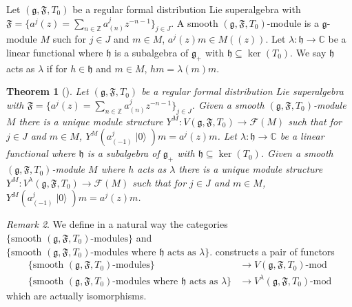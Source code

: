 \documentclass[a4paper, 12pt, reqno]{amsart}
\newtheorem{theorem}{Theorem}[section]
\theoremstyle{remark}
\newtheorem{remark}[theorem]{Remark}
\numberwithin{equation}{subsection}
\DeclareMathOperator{\vac}{|0\rangle}
\begin{document}
Let $(\mathfrak{g}, \mathfrak{F}, T_0)$ be a regular formal distribution Lie superalgebra with $\mathfrak{F} = \{a^j(z) = \sum_{n \in \mathbb{Z}}a^j_{(n)}z^{-n - 1}\}_{j \in J}$.
A smooth $(\mathfrak{g}, \mathfrak{F}, T_0)$-module is a $\mathfrak{g}$-module $M$ such for $j \in J$ and $m \in M$, $a^j(z)m \in M((z))$.
Let $\lambda: \mathfrak{h} \to \mathbb{C}$ be a linear functional where $\mathfrak{h}$ is a subalgebra of $\mathfrak{g}_+$ with $\mathfrak{h} \subseteq \ker(T_0)$.
We say $\mathfrak{h}$ acts as $\lambda$ if for $h \in \mathfrak{h}$ and $m \in M$, $hm = \lambda(m)m$.


\begin{theorem}[{\cite[Theorem 2.15]{li_vertex_2004}}]
  \label{thr:27}
  Let $(\mathfrak{g}, \mathfrak{F}, T_0)$ be a regular formal distribution Lie superalgebra with $\mathfrak{F} = \{a^j(z) = \sum_{n \in \mathbb{Z}}a^j_{(n)}z^{-n - 1}\}_{j \in J}$.
  Given a smooth $(\mathfrak{g}, \mathfrak{F}, T_0)$-module $M$ there is a unique module structure $Y^M: V(\mathfrak{g}, \mathfrak{F}, T_0) \to \mathcal{F}(M)$ such that for $j \in J$ and $m \in M$, $Y^M(a^j_{(-1)}\vac)m = a^j(z)m$.
  Let $\lambda: \mathfrak{h} \to \mathbb{C}$ be a linear functional where $\mathfrak{h}$ is a subalgebra of $\mathfrak{g}_+$ with $\mathfrak{h} \subseteq \ker(T_0)$.
  Given a smooth $(\mathfrak{g}, \mathfrak{F}, T_0)$-module $M$ where $h$ acts as $\lambda$ there is a unique module structure $Y^M: V^{\lambda}(\mathfrak{g}, \mathfrak{F}, T_0) \to \mathcal{F}(M)$ such that for $j \in J$ and $m \in M$, $Y^M(a^j_{(-1)}\vac)m = a^j(z)m$.
\end{theorem}

\begin{remark}
  \label{rmk:20}
  We define in a natural way the categories $\{\text{smooth }(\mathfrak{g}, \mathfrak{F}, T_0)\text{-modules}\}$ and $\{\text{smooth }(\mathfrak{g}, \mathfrak{F}, T_0)\text{-modules where }\mathfrak{h}\text{ acts as }\lambda\}$.
   constructs a pair of functors
  \begin{align*}
    \{\text{smooth }(\mathfrak{g}, \mathfrak{F}, T_0)\text{-modules}\} &\to V(\mathfrak{g}, \mathfrak{F}, T_0)\text{-mod} \\
    \{\text{smooth }(\mathfrak{g}, \mathfrak{F}, T_0)\text{-modules where }\mathfrak{h}\text{ acts as }\lambda\} &\to V^{\lambda}(\mathfrak{g}, \mathfrak{F}, T_0)\text{-mod}
  \end{align*}
  which are actually isomorphisms.
\end{remark}
\end{document}
